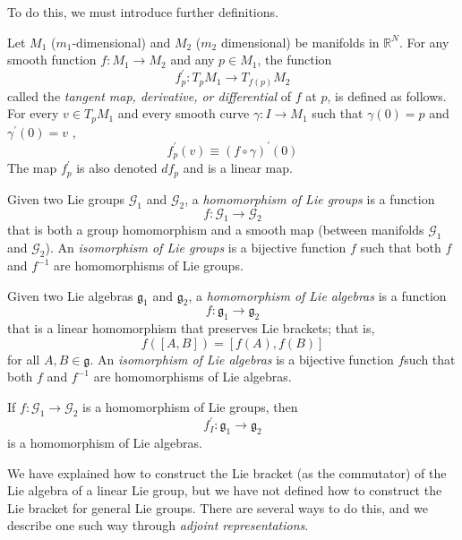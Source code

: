 \documentclass{article}
\begin{document}
    To do this, we must introduce further definitions. 

    \begin{definition}
    Let $M_1$ ($m_1$-dimensional) and $M_2$ ($m_2$ dimensional) be manifolds in $\mathbb{R}^N$. For any smooth function $f: M_1 \longrightarrow M_2$ and any $p \in M_1$, the function 
    \[f^\prime_p: T_p M_1 \longrightarrow T_{f(p)} M_2\]
    called the \textit{tangent map, derivative, or differential} of $f$ at $p$, is defined as follows. For every $v \in T_p M_1$ and every smooth curve $\gamma: I \longrightarrow M_1$ such that $\gamma(0) = p$ and $\gamma^\prime (0) = v$ , 
    \[f^\prime_p(v) \equiv (f \circ \gamma)^\prime (0)\]
    The map $f^\prime_p$ is also denoted $d f_p$ and is a linear map. 
    \end{definition}

    \begin{definition}
    Given two Lie groups $\mathcal{G}_1$ and $\mathcal{G}_2$, a \textit{homomorphism of Lie groups} is a function 
    \[f: \mathcal{G}_1 \longrightarrow \mathcal{G}_2\]
    that is both a group homomorphism and a smooth map (between manifolds $\mathcal{G}_1$ and $\mathcal{G}_2$). An \textit{isomorphism of Lie groups} is a bijective function $f$ such that both $f$ and $f^{-1}$ are homomorphisms of Lie groups. 
    \end{definition}

    \begin{definition}
    Given two Lie algebras $\mathfrak{g}_1$ and $\mathfrak{g}_2$, a \textit{homomorphism of Lie algebras} is a function 
    \[f: \mathfrak{g}_1 \longrightarrow \mathfrak{g}_2\]
    that is a linear homomorphism that preserves Lie brackets; that is, 
    \[f([A,B]) = [f(A), f(B)]\]
    for all $A, B \in \mathfrak{g}$. An \textit{isomorphism of Lie algebras} is a bijective function $f$such that both $f$ and $f^{-1}$ are homomorphisms of Lie algebras. 
    \end{definition}

    \begin{proposition}
    If $f: \mathcal{G}_1 \longrightarrow \mathcal{G}_2$ is a homomorphism of Lie groups, then 
    \[f_I^\prime: \mathfrak{g}_1 \longrightarrow \mathfrak{g}_2\]
    is a homomorphism of Lie algebras. 
    \end{proposition}

    We have explained how to construct the Lie bracket (as the commutator) of the Lie algebra of a linear Lie group, but we have not defined how to construct the Lie bracket for general Lie groups. There are several ways to do this, and we describe one such way through \textit{adjoint representations}. 
\end{document}

